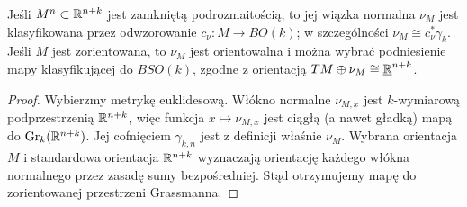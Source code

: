 \begin{stwierdzenie}
\label{prop:normal-class-v9}
Jeśli $M^n\subset\mathbb{R}^{n+k}$ jest zamkniętą
podrozmaitością, to jej wiązka normalna
$\nu_M$ jest klasyfikowana przez odwzorowanie
$c_\nu:M\to BO(k)$; w szczególności
$\nu_M\cong c_\nu^*\gamma_k$.
Jeśli $M$ jest zorientowana, to $\nu_M$ jest
orientowalna i można wybrać podniesienie mapy
klasyfikującej do $BSO(k)$, zgodne z orientacją
$TM\oplus\nu_M\cong\underline{\mathbb{R}}^{n+k}$.
\end{stwierdzenie}
\begin{proof}
Wybierzmy metrykę euklidesową. Włókno normalne
$\nu_{M,x}$ jest $k$-wymiarową podprzestrzenią
$\mathbb{R}^{n+k}$, więc funkcja $x\mapsto\nu_{M,x}$
jest ciągłą (a nawet gładką) mapą do
$\mathrm{Gr}_k(\mathbb{R}^{n+k})$. Jej cofnięciem
$\gamma_{k,n}$ jest z definicji właśnie $\nu_M$.
Wybrana orientacja $M$ i standardowa orientacja
$\mathbb{R}^{n+k}$ wyznaczają orientację każdego włókna
normalnego przez zasadę sumy bezpośredniej.
Stąd otrzymujemy mapę do zorientowanej
przestrzeni Grassmanna.
\end{proof}

